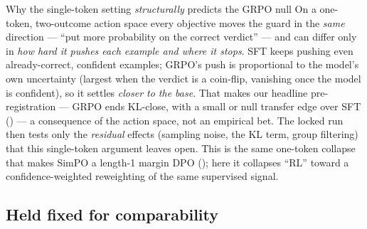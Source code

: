 \begin{takeaway}{Why the single-token setting \emph{structurally} predicts the GRPO null}
On a one-token, two-outcome action space every objective moves the guard in the \emph{same} direction ---
``put more probability on the correct verdict'' --- and can differ only in \emph{how hard it pushes each
example and where it stops}. SFT keeps pushing even already-correct, confident examples; GRPO's push is
proportional to the model's own uncertainty (largest when the verdict is a coin-flip, vanishing once the
model is confident), so it settles \emph{closer to the base}. That makes our headline pre-registration ---
GRPO ends KL-close, with a small or null transfer edge over SFT () --- a consequence of
the action space, not an empirical bet. The locked run then tests only the \emph{residual} effects
(sampling noise, the KL term, group filtering) that this single-token argument leaves open. This is the
same one-token collapse that makes SimPO a length-1 margin DPO (); here it collapses
``RL'' toward a confidence-weighted reweighting of the same supervised signal.
\end{takeaway}

\subsection{Held fixed for comparability}
\label{sec:actII-fixed}

